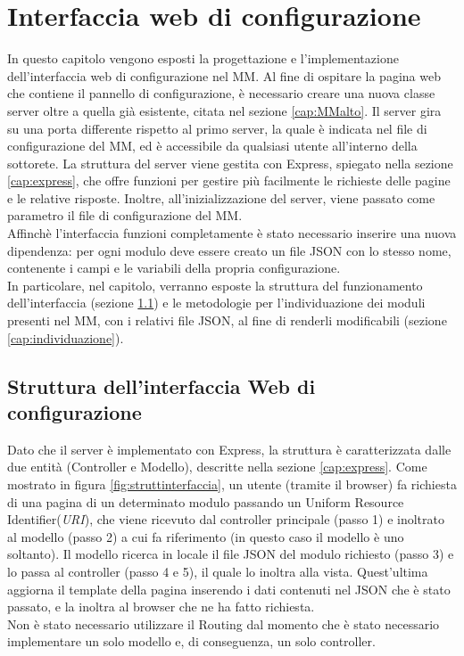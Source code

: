 \chapter{Interfaccia web di configurazione}\label{capitolo5}
In questo capitolo vengono esposti la progettazione e l'implementazione dell'interfaccia web di configurazione
nel MM.
Al fine di ospitare la pagina web che contiene il pannello di configurazione, \`e necessario
creare una nuova classe server oltre a quella gi\`a esistente, citata nel sezione \ref{cap:MMalto}.
Il server gira su una porta differente rispetto al primo server, la quale è indicata nel file di configurazione del MM,
ed \`e accessibile da qualsiasi utente all'interno della sottorete.
La struttura del server viene gestita con Express, spiegato nella sezione \ref{cap:express}, che offre funzioni per gestire
pi\`u facilmente le richieste delle pagine e le relative risposte.
Inoltre, all'inizializzazione del server, viene passato come parametro il file di configurazione del
MM.\\
Affinch\`e l'interfaccia funzioni completamente \`e stato necessario inserire una nuova dipendenza:
per ogni modulo deve essere creato un file JSON con lo stesso nome,
contenente i campi e le variabili della propria configurazione.\\
In particolare, nel capitolo, verranno esposte la struttura del funzionamento dell'interfaccia (sezione \ref{cap:strutturainterfaccia}) e le metodologie per
l'individuazione dei moduli
presenti nel MM, con i relativi file JSON, al fine di renderli modificabili (sezione \ref{cap:individuazione}).\\[1\baselineskip]

\section{Struttura dell'interfaccia Web di configurazione}\label{cap:strutturainterfaccia}
Dato che il server \`e implementato con Express, la struttura
\`e caratterizzata dalle due entit\`a (Controller e Modello), descritte nella sezione \ref{cap:express}.
Come mostrato in figura \ref{fig:struttinterfaccia},
un utente (tramite il browser) fa richiesta di una pagina di un determinato modulo passando un Uniform Resource Identifier(\textit{URI}),
che viene ricevuto dal controller principale (passo 1) e inoltrato al modello (passo 2) a cui fa riferimento (in questo caso il modello
\`e uno soltanto). Il modello ricerca in locale il file JSON del modulo richiesto (passo 3) e lo passa al controller (passo 4 e 5), il quale lo
inoltra alla vista.
Quest'ultima aggiorna il template della pagina inserendo i dati contenuti nel JSON che \`e stato passato, e la inoltra al browser che ne ha fatto richiesta.\\
Non \`e stato necessario utilizzare il Routing dal momento che \`e stato necessario
implementare un solo modello e, di conseguenza, un solo controller.\\[1\baselineskip]

